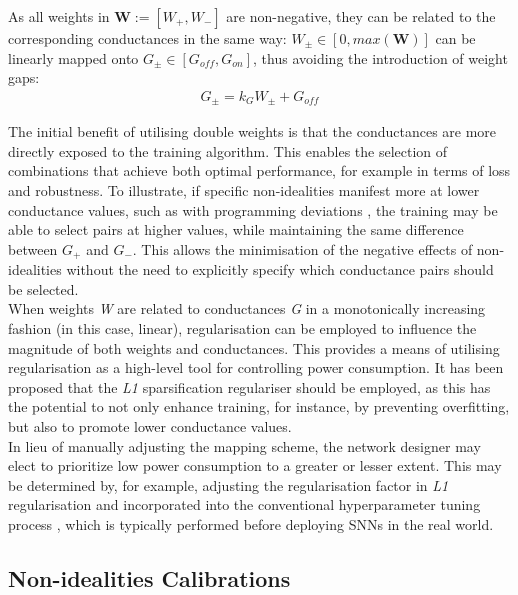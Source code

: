 \noindent As all weights in $\mathbf{W} := [W_+, W_-]$ are non-negative, they can be related to the corresponding conductances in the same way: $W_{\pm} \in [0, max(\mathbf{W})]$ can be linearly mapped onto $G_{\pm} \in [G_{off}, G_{on}]$, thus avoiding the introduction of weight gaps:
\begin{align}
G_{\pm} = k_GW_{\pm} + G_{off} \label{eq:4.31}
\end{align}

\noindent The initial benefit of utilising double weights is that the conductances are more directly exposed to the training algorithm. This enables the selection of combinations that achieve both optimal performance, for example in terms of loss and robustness. To illustrate, if specific non-idealities manifest more at lower conductance values, such as with programming deviations \cite{kim2016voltage}, the training may be able to select pairs at higher values, while maintaining the same difference between $G_+$ and $G_-$. This allows the minimisation of the negative effects of non-idealities without the need to explicitly specify which conductance pairs should be selected. \\

\noindent When weights \textit{W} are related to conductances \textit{G} in a monotonically increasing fashion (in this case, linear), regularisation can be employed to influence the magnitude of both weights and conductances. This provides a means of utilising regularisation as a high-level tool for controlling power consumption. It has been proposed that the \textit{L1} sparsification regulariser \cite{han2015learning} should be employed, as this has the potential to not only enhance training, for instance, by preventing overfitting, but also to promote lower conductance values. \\

\noindent In lieu of manually adjusting the mapping scheme, the network designer may elect to prioritize low power consumption to a greater or lesser extent. This may be determined by, for example, adjusting the regularisation factor in \textit{L1} regularisation and incorporated into the conventional hyperparameter tuning process  \cite{feurer2019hyperparameter}, which is typically performed before deploying SNNs in the real world.


\subsection[Non-idealities Calibrations]{Non-idealities Calibrations}

